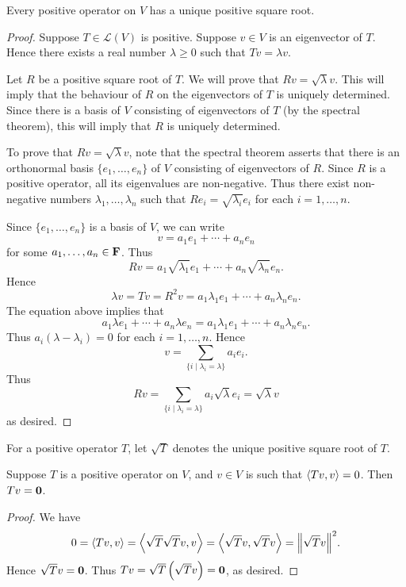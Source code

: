 \begin{lemma}
Every positive operator on $V$ has a unique positive square root.
\end{lemma}

\begin{proof}
Suppose $T\in\mathcal{L}(V)$ is positive.
Suppose $v\in V$ is an eigenvector of $T$.
Hence there exists a real number $\lambda\ge0$ such that $Tv=\lambda v$.

Let $R$ be a positive square root of $T$. We will prove that $Rv=\sqrt{\lambda}v$. This will imply that the behaviour of $R$ on the eigenvectors of $T$ is uniquely determined. 
Since there is a basis of $V$ consisting of eigenvectors of $T$ (by the spectral theorem), this will imply that $R$ is uniquely determined.

To prove that $Rv=\sqrt{\lambda}v$, note that the spectral theorem asserts that there is an orthonormal basis $\{e_1,\dots,e_n\}$ of $V$ consisting of eigenvectors of $R$. Since $R$ is a positive operator, all its eigenvalues are non-negative. Thus there exist non-negative numbers $\lambda_1,\dots,\lambda_n$ such that $Re_i=\sqrt{\lambda_i}e_i$ for each $i=1,\dots,n$.

Since $\{e_1,\dots,e_n\}$ is a basis of $V$, we can write
\[v=a_1e_1+\cdots+a_ne_n\]
for some $a_1,\dots,a_n\in\mathbf F$. Thus
\[Rv=a_1\sqrt{\lambda_1}e_1+\cdots+a_n\sqrt{\lambda_n}e_n.\]
Hence
\[\lambda v=Tv=R^2v=a_1\lambda_1e_1+\cdots+a_n\lambda_ne_n.\]
The equation above implies that
\[a_1\lambda e_1+\cdots+a_n\lambda e_n=a_1\lambda_1e_1+\cdots+a_n\lambda_ne_n.\]
Thus $a_i(\lambda-\lambda_i)=0$ for each $i=1,\dots,n$. Hence
\[v=\sum_{\{i\mid\lambda_i=\lambda\}}a_ie_i.\]
Thus
\[Rv=\sum_{\{i\mid\lambda_i=\lambda\}}a_i\sqrt{\lambda}e_i=\sqrt{\lambda}v\]
as desired.
\end{proof}

\begin{notation}
For a positive operator $T$, let $\sqrt{T}$ denotes the unique positive square root of $T$.
\end{notation}

\begin{corollary}
Suppose $T$ is a positive operator on $V$, and $v\in V$ is such that $\left\langle Tv,v\right\rangle=0$. Then $Tv=\vb{0}$.
\end{corollary}

\begin{proof}
We have
\[0=\left\langle Tv,v\right\rangle=\left\langle\sqrt{T}\sqrt{T}v,v\right\rangle=\left\langle\sqrt{T}v,\sqrt{T}v\right\rangle=\norm{\sqrt{T}v}^2.\]
Hence $\sqrt{T}v=\vb{0}$. Thus $Tv=\sqrt{T}\left(\sqrt{T}v\right)=\vb{0}$, as desired.
\end{proof}
\pagebreak

